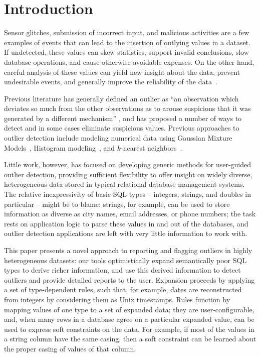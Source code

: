 \section{Introduction}
\label{sec:intro}

Sensor glitches, submission of incorrect input, and malicious activities are a few examples of events that can lead to the insertion of outlying values in a dataset. If undetected, these values can skew statistics, support invalid conclusions, slow database operations, and cause otherwise avoidable expenses. On the other hand, careful analysis of these values can yield new insight about the data, prevent undesirable events, and generally improve the reliability of the data~\cite{Achour2014}.

Previous literature has generally defined an outlier as ``an observation which deviates so much from the other observations as to arouse suspicions that it was generated by a different mechanism'' \cite{Hawkins1980}, and has proposed a number of ways to detect and in some cases eliminate suspicious values. Previous approaches to outlier detection include modeling numerical data using Gaussian Mixture Models~\cite{Lu2005,Roberts1994,Roberts1999}, Histogram modeling~\cite{Gebski2007,Sheng2007}, and $k$-nearest neighbors~\cite{Ramaswamy2000}.

Little work, however, has focused on developing generic methods for user-guided outlier detection, providing sufficient flexibility to offer insight on widely diverse, heterogeneous data stored in typical relational database management systems. The relative inexpressivity of basic SQL types -- integers, strings, and doubles in particular -- might be to blame: strings, for example, can be used to store information as diverse as city names, email addresses, or phone numbers; the task rests on application logic to parse these values in and out of the databases, and outlier detection applications are left with very little information to work with.

This paper presents a novel approach to reporting and flagging outliers in highly heterogeneous datasets: our tools optimistically expand semantically poor SQL types to derive richer information, and use this derived information to detect outliers and provide detailed reports to the user. Expansion proceeds by applying a set of type-dependent rules, such that, for example, dates are reconstructed from integers by considering them as Unix timestamps. Rules function by mapping values of one type to a set of expanded data; they are user-configurable, and, when many rows in a database agree on a particular expanded value, can be used to express soft constraints on the data. For example, if most of the values in a string column have the same casing, then a soft constraint can be learned about the proper casing of values of that column.

